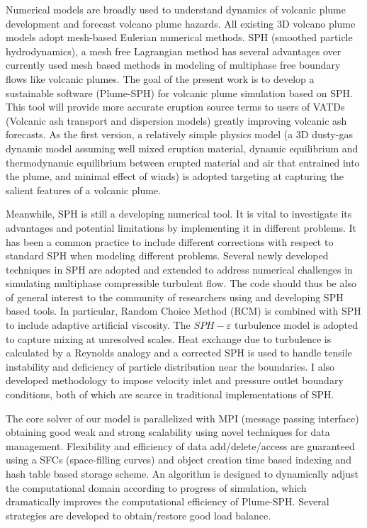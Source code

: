 Numerical models are broadly used to understand dynamics of volcanic plume development and forecast volcano plume hazards. All existing 3D volcano plume models adopt mesh-based Eulerian numerical methods. 
SPH (smoothed particle hydrodynamics), a mesh free Lagrangian method has several advantages over currently used mesh based methods in modeling of multiphase free boundary flows like volcanic plumes. The goal of the present work is to develop a sustainable software (Plume-SPH) for volcanic plume simulation based on SPH.
This tool will provide more accurate eruption source terms to users of VATDs (Volcanic ash transport and dispersion models) greatly improving volcanic ash forecasts.
As the first version, a relatively simple physics model (a 3D dusty-gas dynamic model assuming well mixed eruption material, dynamic equilibrium and thermodynamic equilibrium between erupted material and air that entrained into the plume, and minimal effect of winds) is adopted targeting at capturing the salient features of a volcanic plume. 
 
Meanwhile, SPH is still a developing numerical tool. It is vital to investigate its advantages and potential limitations by implementing it in different problems. It has been a common practice to include different corrections with respect to standard SPH when modeling different problems. Several newly developed techniques in SPH are adopted and extended to address numerical challenges in simulating multiphase compressible turbulent flow. The code should thus be also of general interest to the community of researchers using and developing SPH based tools. In particular, Random Choice Method (RCM) is combined with SPH to include adaptive artificial viscosity. The $SPH-\varepsilon$ turbulence model is adopted to capture mixing at unresolved scales. Heat exchange due to turbulence is calculated by a Reynolds analogy and a corrected SPH is used to handle tensile instability and deficiency of particle distribution near the boundaries. I also developed methodology to impose velocity inlet and pressure outlet boundary conditions, both of which are scarce in traditional implementations of SPH.

The core solver of our model is parallelized with MPI (message passing interface) obtaining good weak and strong scalability using novel techniques for data management. Flexibility and efficiency of data add/delete/access are guaranteed using a SFCs (space-filling curves) and object creation time based indexing and hash table based storage scheme. An algorithm is designed to dynamically adjust the computational domain according to progress of simulation, which dramatically improves the computational efficiency of Plume-SPH. Several strategies are developed to obtain/restore good load balance.

